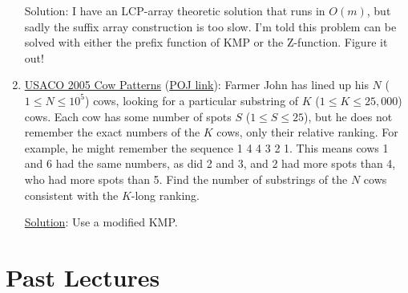 \documentclass[11pt, oneside]{article}
\begin{document}
\begin{enumerate}
  Solution: I have an LCP-array theoretic solution that runs in \( O(m) \), but sadly the suffix array construction is too slow. I'm told this problem can be solved with either the prefix function of KMP or the Z-function. Figure it out!

  \item \href{https://contest.usaco.org/DEC05.htm}{USACO 2005 Cow Patterns} (\href{http://poj.org/problem?id=3167}{POJ link}): Farmer John has lined up his \( N \) (\( 1 \leq N \leq 10^5 \)) cows,
  looking for a particular substring of \( K \) (\( 1 \leq K \leq 25,000 \)) cows.
  Each cow has some number of spots \( S \) (\( 1 \leq S \leq 25 \)), but he does
  not remember the exact numbers of the \( K \) cows, only their relative ranking. For example, he might
  remember the sequence 1 4 4 3 2 1. This means cows 1 and 6 had the same numbers, as did 2 and 3,
  and 2 had more spots than 4, who had more spots than 5.
  Find the number of substrings of the \( N \) cows consistent with the \( K \)-long ranking.

  \href{https://contest.usaco.org/DEC05anal/cpattern.htm}{Solution}: Use a modified KMP.

\end{enumerate}

\newpage

\section{Past Lectures}
\end{document}
